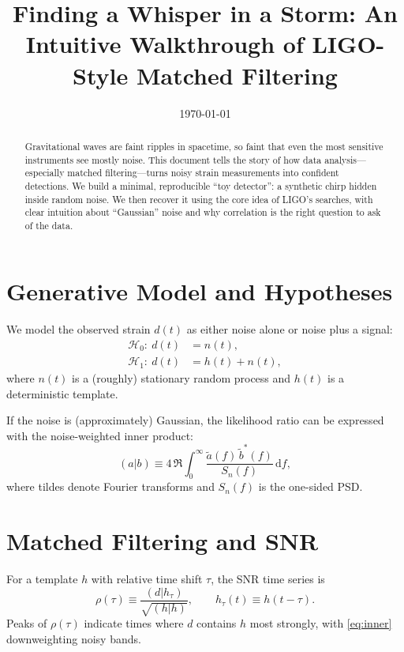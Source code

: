 \documentclass[11pt,a4paper]{article}
\title{Finding a Whisper in a Storm: An Intuitive Walkthrough of LIGO-Style Matched Filtering}
\author{}
\date{\today}
\begin{document}
\maketitle

\begin{abstract}
Gravitational waves are faint ripples in spacetime, so faint that even the most sensitive instruments see mostly noise. This document tells the story of how data analysis---especially matched filtering---turns noisy strain measurements into confident detections. We build a minimal, reproducible ``toy detector'': a synthetic chirp hidden inside random noise. We then recover it using the core idea of LIGO's searches, with clear intuition about ``Gaussian'' noise and why correlation is the right question to ask of the data.
\end{abstract}

\section{Generative Model and Hypotheses}
We model the observed strain $d(t)$ as either noise alone or noise plus a signal:
\begin{align}
\mathcal{H}_0:~ d(t) &= n(t), \label{eq:h0}\\
\mathcal{H}_1:~ d(t) &= h(t) + n(t), \label{eq:h1}
\end{align}
where $n(t)$ is a (roughly) stationary random process and $h(t)$ is a deterministic template.

If the noise is (approximately) Gaussian, the likelihood ratio can be expressed with the noise-weighted inner product:
\begin{equation}
(a|b) \equiv 4\,\Re \int_{0}^{\infty} \frac{\tilde a(f)\,\tilde b^{*}(f)}{S_n(f)}\,\mathrm{d}f, \label{eq:inner}
\end{equation}
where tildes denote Fourier transforms and $S_n(f)$ is the one-sided PSD.

\section{Matched Filtering and SNR}
For a template $h$ with relative time shift $\tau$, the SNR time series is
\begin{equation}
\rho(\tau) \equiv \frac{(d | h_\tau)}{\sqrt{(h|h)}}, \qquad
h_\tau(t) \equiv h(t-\tau). \label{eq:snr}
\end{equation}
Peaks of $\rho(\tau)$ indicate times where $d$ contains $h$ most strongly, with \eqref{eq:inner} downweighting noisy bands.
\end{document}
